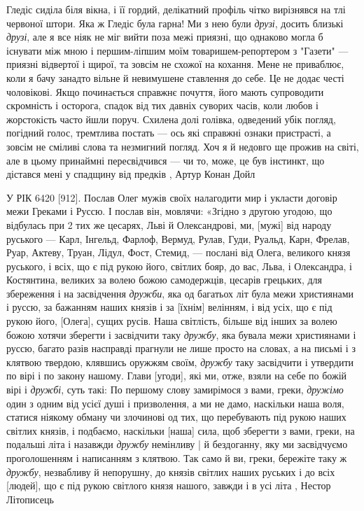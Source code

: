 Гледіс сиділа біля вікна, і її гордий, делікатний профіль чітко вирізнявся на
тлі червоної штори. Яка ж Гледіс була гарна! Ми з нею були \emph{друзі}, досить
близькі \emph{друзі}, але я все ніяк не міг вийти поза межі приязні, що однаково могла
б існувати між мною і першим-ліпшим моїм товаришем-репортером з "Газети" —
приязні відвертої і щирої, та зовсім не схожої на кохання. Мене не приваблює,
коли я бачу занадто вільне й невимушене ставлення до себе. Це не додає честі
чоловікові. Якщо починається справжнє почуття, його мають супроводити
скромність і осторога, спадок від тих давніх суворих часів, коли любов і
жорстокість часто йшли поруч. Схилена долі голівка, одведений убік погляд,
погідний голос, тремтлива постать — ось які справжні ознаки пристрасті, а
зовсім не сміливі слова та незмигний погляд. Хоч я й недовго ще прожив на
світі, але в цьому принаймні пересвідчився — чи то, може, це був інстинкт, що
дістався мені у спадщину від предків
, Артур Конан Дойл

У РІК 6420 [912]. Послав Олег мужів своїх налагодити мир і укласти договір межи
Греками і Руссю. І послав він, мовлячи: «Згідно з другою угодою, що відбулась
при 2 тих же цесарях, Льві й Олександрові, ми, [мужі] від народу руського —
Карл, Інгельд, Фарлоф, Вермуд, Рулав, Гуди, Руальд, Карн, Фрелав, Руар, Актеву,
Труан, Лідул, Фост, Стемид, — послані від Олега, великого князя руського, і
всіх, що є під рукою його, світлих бояр, до вас, Льва, і Олександра, і
Костянтина, великих за волею божою самодержців, цесарів грецьких, для
збереження і на засвідчення \emph{дружби}, яка од багатьох літ була межи християнами і
руссю, за бажанням наших князів і за [їхнім] велінням, і від усіх, що є під
рукою його, [Олега], сущих русів. Наша світлість, більше від інших за волею
божою хотячи зберегти і засвідчити таку \emph{дружбу}, яка бувала межи християнами і
руссю, багато разів насправді прагнули не лише просто на словах, а на письмі і
з клятвою твердою, клявшись оружжям своїм, \emph{дружбу} таку засвідчити і утвердити
по вірі і по закону нашому.  Глави [угоди], які ми, отже, взяли на себе по
божій вірі і \emph{дружбі}, суть такі: По першому слову замирімося з вами, греки,
\emph{дружімо} один з одним від усієї душі і призволення, а ми не дамо, наскільки наша
воля, статися ніякому обману чи злочинові од тих, що перебувають під рукою
наших світлих князів, і подбаємо, наскільки [наша] сила, щоб зберегти з вами,
греки, на подальші літа і назавжди \emph{дружбу} немінливу | й бездоганну, яку ми
засвідчуємо проголошенням і написанням з клятвою. Так само й ви, греки,
бережіте таку ж \emph{дружбу}, незвабливу й непорушну, до князів світлих наших руських
і до всіх [людей], що є під рукою світлого князя нашого, завжди і в усі літа
, Нестор Літописець

